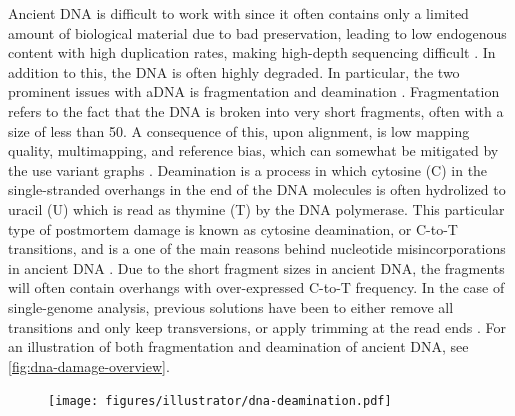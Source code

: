 Ancient DNA is difficult to work with since it often contains only a limited amount of biological material due to bad preservation, leading to low endogenous content with high duplication rates, making high-depth sequencing difficult \autocite{renaudAuthenticationAssessmentContamination2019}.
In addition to this, the DNA is often highly degraded. In particular, the two prominent issues with aDNA is fragmentation and deamination \autocite{dabneyAncientDNADamage2013,peyregnePresentDayDNAContamination2020,}. Fragmentation refers to the fact that the DNA is broken into very short fragments, often with a size of less than \SI{50}{\basepairs}.
A consequence of this, upon alignment, is low mapping quality, multimapping, and reference bias, which can somewhat be mitigated by the use variant graphs \autocite{martinianoRemovingReferenceBias2020}.
Deamination is a process in which cytosine (C) in the single-stranded overhangs in the end of the DNA molecules is often hydrolized to uracil (U) which is read as thymine (T) by the DNA polymerase. This particular type of postmortem damage is known as cytosine deamination, or C-to-T transitions, and is a one of the main reasons behind nucleotide misincorporations in ancient DNA \autocite{briggsPatternsDamageGenomic2007}. Due to the short fragment sizes in ancient DNA, the fragments will often contain overhangs with over-expressed C-to-T frequency. In the case of single-genome analysis, previous solutions have been to either remove all transitions and only keep transversions, or apply trimming at the read ends \autocite{schubertImprovingAncientDNA2012}.
For an illustration of both fragmentation and deamination of ancient DNA, see  \autoref{fig:dna-damage-overview}.

\begin{figure}[htbp]
    \centering
    \texttt{[image: figures/illustrator/dna-deamination.pdf]}
\end{figure}

